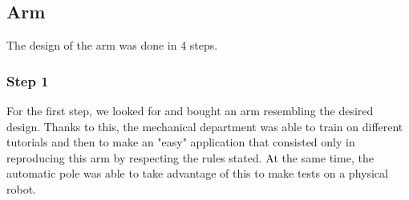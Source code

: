 \subsection{Arm}
\label{Arm}
The design of the arm was done in 4 steps.

\subsubsection{Step 1}

For the first step, we looked for and bought an arm resembling the desired design. Thanks to this, the mechanical department was able to train on different tutorials and then to make an "easy" application that consisted only in reproducing this arm by respecting the rules stated. At the same time, the automatic pole was able to take advantage of this to make tests on a physical robot.
